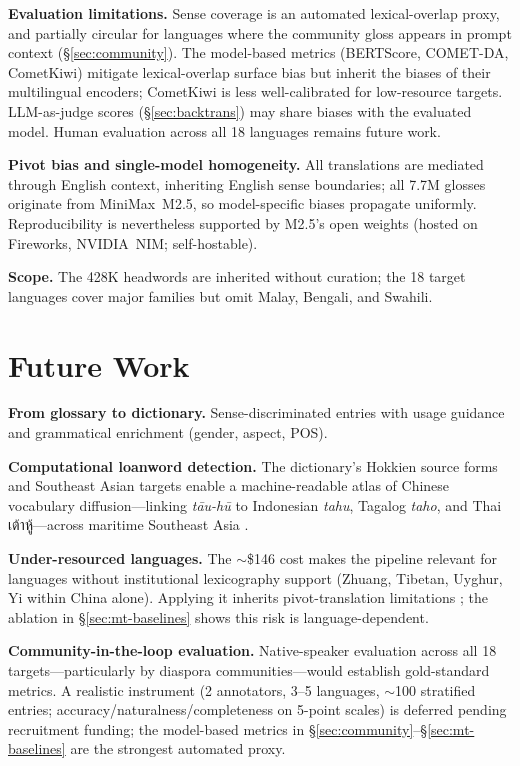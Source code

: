 \documentclass[11pt]{article}
\begin{document}
\textbf{Evaluation limitations.} Sense coverage is an automated lexical-overlap proxy, and partially circular for languages where the community gloss appears in prompt context (\S\ref{sec:community}). The model-based metrics (BERTScore, COMET-DA, CometKiwi) mitigate lexical-overlap surface bias but inherit the biases of their multilingual encoders; CometKiwi is less well-calibrated for low-resource targets. LLM-as-judge scores (\S\ref{sec:backtrans}) may share biases with the evaluated model. Human evaluation across all 18 languages remains future work.

\textbf{Pivot bias and single-model homogeneity.} All translations are mediated through English context, inheriting English sense boundaries; all 7.7M glosses originate from MiniMax~M2.5, so model-specific biases propagate uniformly. Reproducibility is nevertheless supported by M2.5's open weights (hosted on Fireworks, NVIDIA~NIM; self-hostable).

\textbf{Scope.} The 428K headwords are inherited without curation; the 18 target languages cover major families but omit Malay, Bengali, and Swahili.


\section{Future Work}
\label{sec:future}

\textbf{From glossary to dictionary.} Sense-discriminated entries with usage guidance and grammatical enrichment (gender, aspect, POS).

\textbf{Computational loanword detection.} The dictionary's Hokkien source forms and Southeast Asian targets enable a machine-readable atlas of Chinese vocabulary diffusion---linking \textit{tāu-hū} to Indonesian \textit{tahu}, Tagalog \textit{taho}, and Thai \foreignlanguage{thai}{เต้าหู้}---across maritime Southeast Asia \citep{chanyap1980}.

\textbf{Under-resourced languages.} The $\sim$\$146 cost makes the pipeline relevant for languages without institutional lexicography support (Zhuang, Tibetan, Uyghur, Yi within China alone). Applying it inherits pivot-translation limitations \citep{haddow2022lowresource}; the ablation in \S\ref{sec:mt-baselines} shows this risk is language-dependent.

\textbf{Community-in-the-loop evaluation.} Native-speaker evaluation across all 18 targets---particularly by diaspora communities---would establish gold-standard metrics. A realistic instrument (2 annotators, 3--5 languages, $\sim$100 stratified entries; accuracy/naturalness/completeness on 5-point scales) is deferred pending recruitment funding; the model-based metrics in \S\ref{sec:community}--\S\ref{sec:mt-baselines} are the strongest automated proxy.
\end{document}
